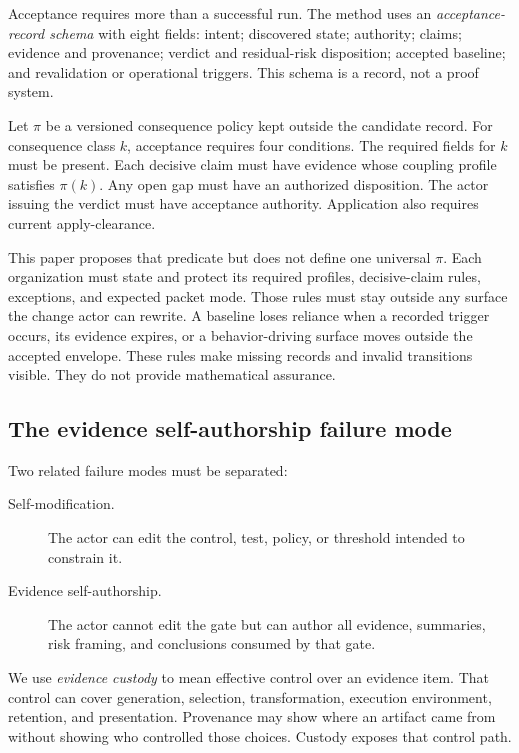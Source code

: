 \documentclass[11pt]{article}
\begin{document}
Acceptance requires more than a successful run. The method uses an \emph{acceptance-record schema} with eight fields: intent; discovered state; authority; claims; evidence and provenance; verdict and residual-risk disposition; accepted baseline; and revalidation or operational triggers. This schema is a record, not a proof system.

Let $\pi$ be a versioned consequence policy kept outside the candidate record. For consequence class $k$, acceptance requires four conditions. The required fields for $k$ must be present. Each decisive claim must have evidence whose coupling profile satisfies $\pi(k)$. Any open gap must have an authorized disposition. The actor issuing the verdict must have acceptance authority. Application also requires current apply-clearance.

This paper proposes that predicate but does not define one universal $\pi$. Each organization must state and protect its required profiles, decisive-claim rules, exceptions, and expected packet mode. Those rules must stay outside any surface the change actor can rewrite. A baseline loses reliance when a recorded trigger occurs, its evidence expires, or a behavior-driving surface moves outside the accepted envelope. These rules make missing records and invalid transitions visible. They do not provide mathematical assurance.

\subsection{The evidence self-authorship failure mode}

Two related failure modes must be separated:

\begin{description}
  \item[Self-modification.] The actor can edit the control, test, policy, or threshold intended to constrain it.
  \item[Evidence self-authorship.] The actor cannot edit the gate but can author all evidence, summaries, risk framing, and conclusions consumed by that gate.
\end{description}

We use \emph{evidence custody} to mean effective control over an evidence item. That control can cover generation, selection, transformation, execution environment, retention, and presentation. Provenance may show where an artifact came from without showing who controlled those choices. Custody exposes that control path.
\end{document}
